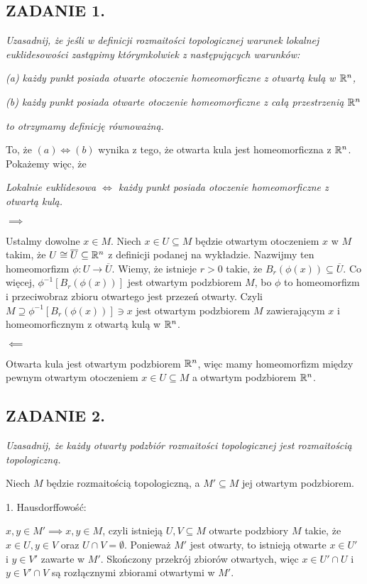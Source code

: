 \documentclass{article}
\begin{document}
\subsection*{ZADANIE 1.}
\emph{\color{pink}Uzasadnij, że jeśli w definicji rozmaitości topologicznej warunek lokalnej euklidesowości zastąpimy którymkolwiek z następujących warunków:}

\emph{\color{pink}(a) każdy punkt posiada otwarte otoczenie homeomorficzne z otwartą kulą w $\mathbb{R}^n$,}

\emph{\color{pink}(b) każdy punkt posiada otwarte otoczenie homeomorficzne z całą przestrzenią $\mathbb{R}^n$}

\emph{\color{pink}to otrzymamy definicję równoważną.}
\medskip

To, że $(a)\iff(b)$ wynika z tego, że otwarta kula jest homeomorficzna z $\mathbb{R}^n$. Pokażemy więc, że

\emph{Lokalnie euklidesowa $\iff$ każdy punkt posiada otoczenie homeomorficzne z otwartą kulą.}

$\implies$

Ustalmy dowolne $x\in M$. Niech $x\in U\subseteq M$ będzie otwartym otoczeniem $x$ w $M$ takim, że $U\cong \overline U\subseteq\mathbb{R}^n$ z definicji podanej na wykładzie. Nazwijmy ten homeomorfizm $\phi:U\to\overline U$. Wiemy, że istnieje $r>0$ takie, że $B_r(\phi(x))\subseteq\overline U$. Co więcej, $\phi^{-1}[B_r(\phi(x))]$ jest otwartym podzbiorem $M$, bo $\phi$ to homeomorfizm i przeciwobraz zbioru otwartego jest przezeń otwarty. Czyli $M\supseteq \phi^{-1}[B_r(\phi(x))]\ni x$ jest otwartym podzbiorem $M$ zawierającym $x$ i homeomorficznym z otwartą kulą w $\mathbb{R}^n$.

$\impliedby$

Otwarta kula jest otwartym podzbiorem $\mathbb{R}^n$, więc mamy homeomorfizm między pewnym otwartym otoczeniem $x\in U\subseteq M$ a otwartym podzbiorem $\mathbb{R}^n$.

\subsection*{ZADANIE 2.}
\emph{\color{pink}Uzasadnij, że każdy otwarty podzbiór rozmaitości topologicznej jest rozmaitością topologiczną.}
\medskip

Niech $M$ będzie rozmaitością topologiczną, a $M'\subseteq M$ jej otwartym podzbiorem.

1. Hausdorffowość: 

$x,y\in M'\implies x,y\in M$, czyli istnieją $U,V\subseteq M$ otwarte podzbiory $M$ takie, że $x\in U,y\in V$ oraz $U\cap V=\emptyset$. Ponieważ $M'$ jest otwarty, to istnieją otwarte $x\in U'$ i $y\in V'$ zawarte w $M'$. Skończony przekrój zbiorów otwartych, więc $x\in U'\cap U$ i $y\in V'\cap V$ są rozłącznymi zbiorami otwartymi w $M'$.
\end{document}
